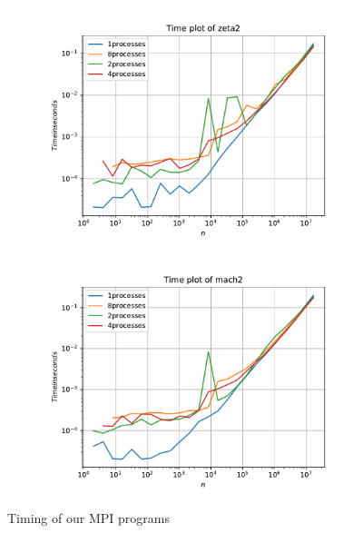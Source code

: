 \documentclass[12pt]{article}
\begin{document}
\begin{figure}
    \centering
    \begin{subfigure}[!htb]{0.45\textwidth}
        \includegraphics[width=\textwidth]{zeta2Time}
    \end{subfigure}
    \begin{subfigure}[!htb]{0.45\textwidth}
        \includegraphics[width=\textwidth]{mach2Time}
    \end{subfigure}
    \caption{Timing of our MPI programs}\label{fig:Time2}
\end{figure}
\end{document}
